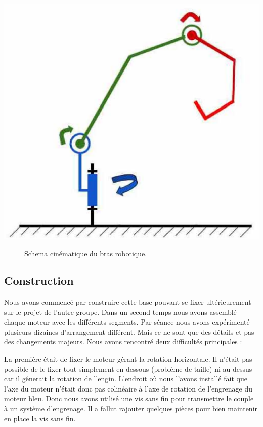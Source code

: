 \documentclass[twoside,twocolumn, 16pt]{article}
\begin{document}
\begin{center}
\includegraphics[scale = 0.3]{cin.eps}
\begin{figure}[!h]
\caption{Schema cinématique du bras robotique.}
\end{figure}
\end{center}

\subsection{Construction}
Nous avons commencé par construire cette base pouvant se fixer ultérieurement sur le projet de l’autre groupe. 
Dans un second temps nous avons assemblé chaque moteur avec les différents segments. 
Par séance nous avons expérimenté plusieurs dizaines d’arrangement différent. Mais ce ne sont que des détails et pas des changements majeurs.
Nous avons rencontré deux difficultés principales :

La première était de fixer le moteur gérant la rotation horizontale. 
Il n’était pas possible de le fixer tout simplement en dessous (problème de taille) ni au dessus car il gênerait la rotation de l’engin. L’endroit où nous l’avons installé fait que l’axe du moteur n’était donc pas colinéaire à l’axe de rotation de l’engrenage du moteur bleu. Donc nous avons utilisé une vis sans fin pour transmettre le couple à un système d’engrenage. Il a fallut rajouter quelques pièces pour bien maintenir en place la vis sans fin. 
\end{document}
